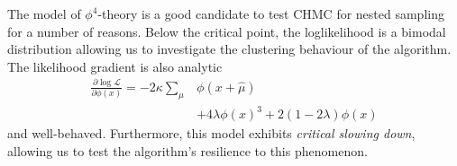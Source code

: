 \documentclass[11pt]{article}
\begin{document}
    The model of $\phi^4$-theory is a good candidate to test CHMC for nested sampling for a number of reasons.
    Below the critical point, the loglikelihood is a bimodal distribution allowing us to investigate the clustering
    behaviour of the algorithm.
    The likelihood gradient is also analytic
    \begin{equation}\label{eq:grad_likelihood}
    \begin{aligned}
        \frac{\partial \log{\mathcal{L}}} {\partial \phi(x)} = -2\kappa \sum\limits_{\mu} &\phi(x+\hat{\mu}) \\
        &+ 4\lambda \phi(x)^3 + 2(1-2\lambda)\phi(x)
    \end{aligned}
    \end{equation}
    and well-behaved.
    Furthermore, this model exhibits \emph{critical slowing down}, allowing us to
    test the algorithm's resilience to this phenomenon.
\end{document}
